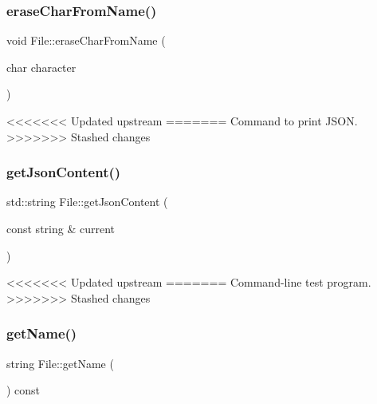 \subsubsection{\texorpdfstring{erase\+Char\+From\+Name()}{eraseCharFromName()}}
{\footnotesize\ttfamily void File\+::erase\+Char\+From\+Name (\begin{DoxyParamCaption}\item[{char}]{character }\end{DoxyParamCaption})\hspace{0.3cm}{\ttfamily [inline]}}

<<<<<<< Updated upstream
\mbox{\label{class_file_afaee512326a13dc99d6b8d08522eabe8}} 
=======
Command to print J\+S\+ON. \mbox{\label{class_file_afaee512326a13dc99d6b8d08522eabe8}} 
>>>>>>> Stashed changes
\subsubsection{\texorpdfstring{get\+Json\+Content()}{getJsonContent()}}
{\footnotesize\ttfamily std\+::string File\+::get\+Json\+Content (\begin{DoxyParamCaption}\item[{const string \&}]{current }\end{DoxyParamCaption})}

<<<<<<< Updated upstream
\mbox{\label{class_file_a4b6032847dfd076db8ed44a532387f07}} 
=======
Command-\/line test program. \mbox{\label{class_file_a4b6032847dfd076db8ed44a532387f07}} 
>>>>>>> Stashed changes
\subsubsection{\texorpdfstring{get\+Name()}{getName()}}
{\footnotesize\ttfamily string File\+::get\+Name (\begin{DoxyParamCaption}{ }\end{DoxyParamCaption}) const\hspace{0.3cm}{\ttfamily [inline]}}

\mbox{\label{class_file_aadbe64432e7e403f546ff35a3bfa8d97}} 
